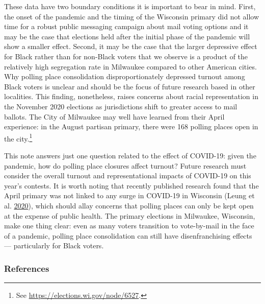 \documentclass[
  12pt,
]{article}
\begin{document}
These data have two boundary conditions it is important to bear in mind. First, the onset of the pandemic and the timing of the Wisconsin primary did not allow time for a robust public messaging campaign about mail voting options and it may be the case that elections held after the initial phase of the pandemic will show a smaller effect. Second, it may be the case that the larger depressive effect for Black rather than for non-Black voters that we observe is a product of the relatively high segregation rate in Milwaukee compared to other American cities. Why polling place consolidation disproportionately depressed turnout among Black voters is unclear and should be the focus of future research based in other localities. This finding, nonetheless, raises concerns about racial representation in the November 2020 elections as jurisdictions shift to greater access to mail ballots. The City of Milwaukee may well have learned from their April experience: in the August partisan primary, there were 168 polling places open in the city.\footnote{See \url{https://elections.wi.gov/node/6527}.}

This note answers just one question related to the effect of COVID-19: given the pandemic, how do polling place closures affect turnout? Future research must consider the overall turnout and representational impacts of COVID-19 on this year's contests. It is worth noting that recently published research found that the April primary was not linked to any surge in COVID-19 in Wisconsin (Leung et al. \protect\hyperlink{ref-Leung2020}{2020}), which should allay concerns that polling places can only be kept open at the expense of public health. The primary elections in Milwaukee, Wisconsin, make one thing clear: even as many voters transition to vote-by-mail in the face of a pandemic, polling place consolidation can still have disenfranchising effects --- particularly for Black voters.

\newpage

\hypertarget{references}{%
\subsubsection*{References}\label{references}}
\end{document}
